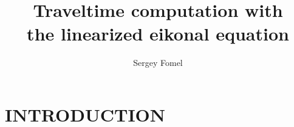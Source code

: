 
\title{Traveltime computation with \\ the linearized eikonal equation}

\author{Sergey Fomel}

\maketitle

\section{INTRODUCTION}

